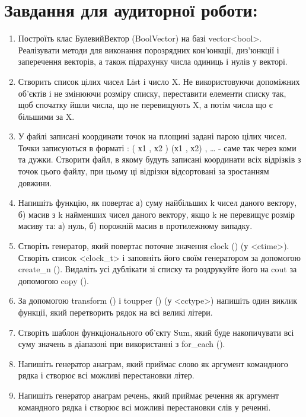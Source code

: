 \documentclass[a5paper,titlepage,openany,twoside,draft]{book_unv}%
\begin{document}
\section{Завдання для аудиторної роботи:}

\begin{enumerate}
\def\labelenumi{\arabic{enumi})}

\item
Построїть клас БулевийВектор (BoolVector) на базі vector\textless{}bool\textgreater{}. 
Реалізувати методи для виконання порозрядних кон'юнкції, диз'юнкції і 
заперечення векторів, а також підрахунку числа одиниць і нулів у векторі.
  
\item
  Створить список цілих чисел List і число X. Не використовуючи
  допоміжних об'єктів і не змінюючи розміру списку, переставити елементи
  списку так, щоб спочатку йшли числа, що не перевищують X, а потім
  числа що є більшими за X.

\item
  У файлі записані координати точок на площині задані парою цілих чисел.
  Точки записуються в форматі : ( х1 , х2 ) (х1 , х2) , \ldots{} - саме
  так через коми та дужки. Створити файл, в якому будуть записані
  координати всіх відрізків з точок цього файлу, при цьому ці відрізки
  відсортовані за зростанням довжини.
\item
  Напишіть функцію, як повертає а) суму найбільших k чисел даного
  вектору, б) масив з k найменших чисел даного вектору, якщо k не
  перевищує розмір масиву та: а) нуль, б) порожній масив в протилежному
  випадку.
\item
  Створіть генератор, який повертає поточне значення clock () (у
  \textless{}ctime\textgreater{}). Створіть список
  \textless{}clock\_t\textgreater{} і заповніть його своїм генератором
  за допомогою create\_n (). Видаліть усі дублікати зі списку та
  роздрукуйте його на cout за допомогою copy ().
\item
  За допомогою transform () і toupper () (у
  \textless{}cctype\textgreater{}) напишіть один виклик функції, який
  перетворить рядок на всі великі літери.
\item
  Створіть шаблон функціонального об'єкту Sum, який буде накопичувати всі
  суму значень в діапазоні при використанні з for\_each ().
\item
  Напишіть генератор анаграм, який приймає слово як аргумент командного
  рядка і створює всі можливі перестановки літер.
\item
  Напишіть генератор анаграм речень, який приймає речення як аргумент
  командного рядка і створює всі можливі перестановки слів у реченні.
\end{enumerate}
\end{document}
